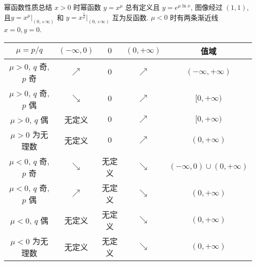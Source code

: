 \begin{frame}{幂函数性质总结}
	\beqskip{0pt}
	\onslide<+->
	$x>0$ 时幂函数 $y=x^\mu$ 总有定义且 $y=e^{\mu\ln x}$, 图像经过 $(1,1)$, 且$y=x^\mu|_{(0,+\infty)}$ 和 $y=x^{\frac1\mu}|_{(0,+\infty)}$ 互为反函数.
	$\mu<0$ 时有两条渐近线 $x=0, y=0$.
	\onslide<+->
	\begin{center}
		\begin{tabular}{ccccc} \toprule
			$\mu=p/q$   &$(-\infty,0)$&$0$ &$(0,+\infty)$&值域\\\toprule
			$\mu>0$, $q$ 奇, $p$ 奇&$\nearrow$&$0$&$\nearrow$&$(-\infty,+\infty)$\\\midrule
			$\mu>0$, $q$ 奇, $p$ 偶&$\searrow$&$0$&$\nearrow$&$[0,+\infty)$\\\midrule
			$\mu>0$, $q$ 偶        &无定义    &$0$&$\nearrow$&$[0,+\infty)$\\\midrule
			$\mu>0$ 为无理数       &无定义    &$0$&$\nearrow$&$(0,+\infty)$\\\midrule			
			$\mu<0$, $q$ 奇, $p$ 奇&$\searrow$&无定义&$\searrow$&$(-\infty,0)\cup(0,+\infty)$\\\midrule
			$\mu<0$, $q$ 奇, $p$ 偶&$\nearrow$&无定义&$\searrow$&$(0,+\infty)$\\\midrule
			$\mu<0$, $q$ 偶        &无定义    &无定义&$\searrow$&$(0,+\infty)$\\\midrule
			$\mu<0$ 为无理数       &无定义    &无定义&$\searrow$&$(0,+\infty)$\\ \bottomrule
		\end{tabular}
	\end{center}
	\endgroup
\end{frame}


